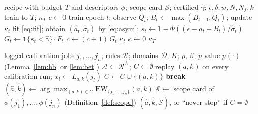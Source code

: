 \documentclass[3p,twocolumn,10pt]{elsarticle}
\theoremstyle{definition}
\begin{document}
\begin{algorithm}[t]
\caption{EcoStop online rule (deployment of a certified $\hat\gamma$)}
\label{alg:ecostop}
\begin{algorithmic}[1]
\Require recipe with budget $T$ and descriptors $\phi$; scope card $\mathcal{S}$; certified $\hat\gamma$; $\epsilon,\delta,w,N,N_f,k$
 \State train to $T$; \Return $\kappa_T$  \EndIf
\State $c\gets0$
  \State train epoch $t$; observe $Q_t$; $B_t\gets\max(B_{t-1},Q_t)$; update $\kappa_t$
    \State fit \eqref{eq:fit}; obtain $(\hat a_t,\hat\sigma_t)$ by \eqref{eq:asym}; $s_t\gets1-\Phi((\epsilon-\hat a_t+B_t)/\hat\sigma_t)$
    \State $G_t\gets\mathbf{1}\{s_t<\hat\gamma\}\cdot F_t$ 
    \State $c\gets(c+1)\,G_t$ 
     \Return $\kappa_t$  \EndIf
  \Else \State $c\gets0$
  \EndIf
\EndFor
\State \Return $\kappa_T$
\end{algorithmic}
\end{algorithm}

\begin{algorithm}[t]
\caption{Offline certification with rule selection and scope card}
\label{alg:certify}
\begin{algorithmic}[1]
\Require logged calibration jobs $j_1,\dots,j_n$; rules $\mathcal{R}$; domains $\mathcal{D}$; $K$; $\rho$, $\beta$; $p$-value $p(\cdot)$ (Lemma~\ref{lem:hb} or \ref{lem:bet})
\State $\mathcal{A}\gets\mathcal{R}^{\mathcal{D}}$; $C\gets\emptyset$
    \State replay $(a,k)$ on every calibration run; $x_l\gets L_{a,k}(j_l)$ 
     \State $C\gets C\cup\{(a,k)\}$ \Else \State \textbf{break}  \EndIf
  \EndFor
\EndFor
\State $(\hat a,\hat k)\gets\arg\max_{(a,k)\in C}\mathrm{EW}_{\{j_1,\dots,j_n\}}(a,k)$ 
\State $\mathcal{S}\gets$ scope card of $\phi(j_1),\dots,\phi(j_n)$ (Definition~\ref{def:scope})
\State \Return $(\hat a,\hat k,\mathcal{S})$, or ``never stop'' if $C=\emptyset$
\end{algorithmic}
\end{algorithm}
\end{document}
